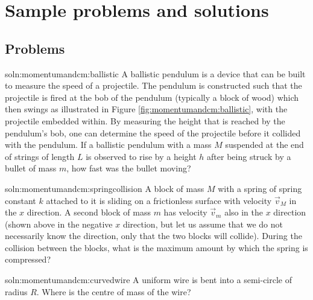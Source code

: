 \newpage
\section{Sample problems and solutions}
\subsection{Problems}

\begin{problem}{soln:momentumandcm:ballistic}{\label{prob:momencumandcm:ballistic} 
A ballistic pendulum is a device that can be built to measure the speed of a projectile. The pendulum is constructed such that the projectile is fired at the bob of the pendulum (typically a block of wood) which then swings as illustrated in Figure \ref{fig:momentumandcm:ballistic}, with the projectile embedded within. By measuring the height that is reached by the pendulum's bob, one can determine the speed of the projectile before it collided with the pendulum. If a ballistic pendulum with a mass $M$ suspended at the end of strings of length $L$ is observed to rise by a height $h$ after being struck by a bullet of mass $m$, how fast was the bullet moving?}
\end{problem}

\begin{problem}{soln:momentumandcm:springcollision}{\label{prob:momencumandcm:springcollision}  A block of mass $M$ with a spring of spring constant $k$ attached to it is sliding on a frictionless surface with velocity $\vec v_M$ in the $x$ direction. A second block of mass $m$ has velocity $\vec v_m$ also in the $x$ direction (shown above in the negative $x$ direction, but let us assume that we do not necessarily know the direction, only  that the two blocks will collide). During the collision between the blocks, what is the maximum amount by which the spring is compressed?
}
\end{problem}

\begin{problem}{soln:momentumandcm:curvedwire}{\label{prob:momencumandcm:curvedwire} A uniform wire is bent into a semi-circle of radius $R$. Where is the centre of mass of the wire?}
\end{problem}

